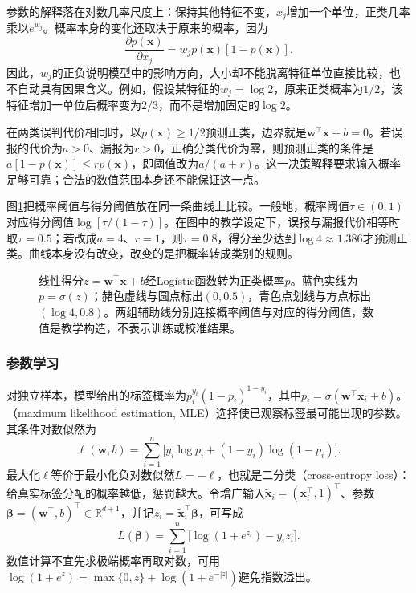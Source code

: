 参数的解释落在对数几率尺度上：保持其他特征不变，$x_j$增加一个单位，正类几率乘以$e^{w_j}$。概率本身的变化还取决于原来的概率，因为
\[
  \frac{\partial p(\bm{x})}{\partial x_j}
  =w_jp(\bm{x})[1-p(\bm{x})].
\]
因此，$w_j$的正负说明模型中的影响方向，大小却不能脱离特征单位直接比较，也不自动具有因果含义。例如，假设某特征的$w_j=\log 2$，原来正类概率为$1/2$，该特征增加一单位后概率变为$2/3$，而不是增加固定的$\log 2$。

在两类误判代价相同时，以$p(\bm{x})\geq1/2$预测正类，边界就是$\bm{w}^{\top}\bm{x}+b=0$。若误报的代价为$a>0$、漏报为$r>0$，正确分类代价为零，则预测正类的条件是$a[1-p(\bm{x})]\leq rp(\bm{x})$，即阈值改为$a/(a+r)$。这一决策解释要求输入概率足够可靠；合法的数值范围本身还不能保证这一点。

图\ref{fig:classification-logistic-probability}把概率阈值与得分阈值放在同一条曲线上比较。一般地，概率阈值$\tau\in(0,1)$对应得分阈值$\log[\tau/(1-\tau)]$。在图中的教学设定下，误报与漏报代价相等时取$\tau=0.5$；若改成$a=4$、$r=1$，则$\tau=0.8$，得分至少达到$\log4\approx1.386$才预测正类。曲线本身没有改变，改变的是把概率转成类别的规则。
\begin{figure}[htbp]
  \centering
  
  \caption{线性得分$z=\bm{w}^{\top}\bm{x}+b$经Logistic函数转为正类概率$p$。蓝色实线为$p=\sigma(z)$；赭色虚线与圆点标出$(0,0.5)$，青色点划线与方点标出$(\log4,0.8)$。两组辅助线分别连接概率阈值与对应的得分阈值，数值是教学构造，不表示训练或校准结果。}
  \label{fig:classification-logistic-probability}
\end{figure}

\subsubsection{参数学习}
\label{sec:classification-logistic-learning}

对独立样本，模型给出的标签概率为$p_i^{y_i}(1-p_i)^{1-y_i}$，其中$p_i=\sigma(\bm{w}^{\top}\bm{x}_i+b)$。（maximum likelihood estimation, MLE）选择使已观察标签最可能出现的参数。其条件对数似然为
\begin{equation}
  \label{eq:classification-logistic-likelihood}
  \ell(\bm{w},b)
  =\sum_{i=1}^{n}
  \bigl[y_i\log p_i+(1-y_i)\log(1-p_i)\bigr].
\end{equation}
最大化$\ell$等价于最小化负对数似然$L=-\ell$，也就是二分类（cross-entropy loss）：给真实标签分配的概率越低，惩罚越大。令增广输入$\tilde{\bm{x}}_i=(\bm{x}_i^{\top},1)^{\top}$、参数$\bm{\beta}=(\bm{w}^{\top},b)^{\top}\in\mathbb{R}^{d+1}$，并记$z_i=\tilde{\bm{x}}_i^{\top}\bm{\beta}$，可写成
\begin{equation}
  \label{eq:classification-logistic-loss}
  L(\bm{\beta})
  =\sum_{i=1}^{n}\bigl[\log(1+e^{z_i})-y_i z_i\bigr].
\end{equation}
数值计算不宜先求极端概率再取对数，可用$\log(1+e^z)=\max\{0,z\}+\log(1+e^{-|z|})$避免指数溢出。

